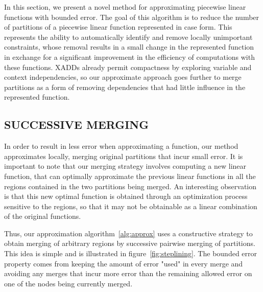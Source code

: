 In this section, we present a novel method for approximating piecewise linear functions with bounded error. The goal of this algorithm is to reduce the number of partitions of a piecewise linear function represented in case form. This represents the ability to automatically identify and remove locally unimportant constraints, whose removal results in a small change in the represented function in exchange for a significant improvement in the efficiency of computations with these functions. XADDs already permit compactness by exploring variable and context independencies, so our approximate approach goes further to merge partitions as a form of removing dependencies that had little influence in the represented function. 

\subsection{SUCCESSIVE MERGING}
In order to result in less error when approximating a function, our method approximates locally, merging original partitions that incur small error. It is important to note that our merging strategy involves computing a new linear function, that can optimally approximate the previous linear functions in all the regions contained in the two partitions being merged. An interesting observation is that this new optimal function is obtained through an optimization process sensitive to the regions, so that it may not be obtainable as a linear combination of the original functions. 

Thus, our approximation algorithm~\ref{alg:approx} uses a constructive strategy to obtain merging of arbitrary regions by successive pairwise merging of partitions. This idea is simple and is illustrated in figure~\ref{fig:steplining}. The bounded error property comes from keeping the amount of error "used" in every merge and avoiding any merges that incur more error than the remaining allowed error on one of the nodes being currently merged.


